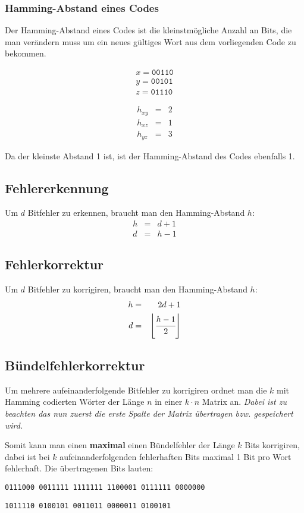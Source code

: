\documentclass
[
	8pt,		%
	ngerman,	%
	a4paper,	%
	landscape,	%
	final		%
]{extarticle}
\begin{document}
\begin{multicols*}{4}
	\subsubsection*{Hamming-Abstand eines Codes}
	Der Hamming-Abstand eines Codes ist die kleinstmögliche Anzahl an Bits, die
	man verändern muss um ein neues gültiges Wort aus dem vorliegenden Code zu
	bekommen.
	\example
	\begin{center}
		\begin{minipage}{.35\linewidth}
			\begin{align*}
				x = \texttt{00110} \\
				y = \texttt{00101} \\
				z = \texttt{01110}
			\end{align*}
		\end{minipage}
		\begin{minipage}{.35\linewidth}
			\begin{eqnarray*}
				h_{xy} &=& 2    \\
				h_{xz} &=& 1    \\
				h_{yz} &=& 3
			\end{eqnarray*}
		\end{minipage}
	\end{center} \par
	Da der kleinste Abstand 1 ist, ist der Hamming-Abstand des Codes ebenfalls 1.
	\subsection{Fehlererkennung}
	Um \(d\) Bitfehler zu erkennen, braucht man den Hamming-Abstand \(h\):
	\begin{eqnarray*}
		h &=& d + 1 \\
		d &=& h - 1
	\end{eqnarray*}
	\subsection{Fehlerkorrektur}
	Um \(d\) Bitfehler zu korrigiren, braucht man den Hamming-Abstand \(h\):
	\begin{eqnarray*}
		h &=& 2d + 1 \\
		d &=& \left\lfloor\cfrac{h - 1}{2}\right\rfloor
	\end{eqnarray*}
	\subsection{Bündelfehlerkorrektur}
	Um mehrere aufeinanderfolgende Bitfehler zu korrigiren ordnet man die \(k\)
	mit Hamming codierten Wörter der Länge \(n\) in einer \(k \cdot n\) Matrix
	an. \emph{Dabei ist zu beachten das nun zuerst die erste Spalte der Matrix
	übertragen bzw. gespeichert wird.}\par Somit kann man einen \textbf{maximal}
	einen Bündelfehler der Länge \(k\) Bits korrigiren, dabei ist bei \(k\)
	aufeinanderfolgenden fehlerhaften Bits maximal 1 Bit pro Wort fehlerhaft.
	\example
	Die übertragenen Bits lauten:\par
	\texttt{0111000 0011111 1111111 1100001 0111111 0000000}\par
	\texttt{1011110 0100101 0011011 0000011 0100101}

\end{multicols*}
\end{document}
